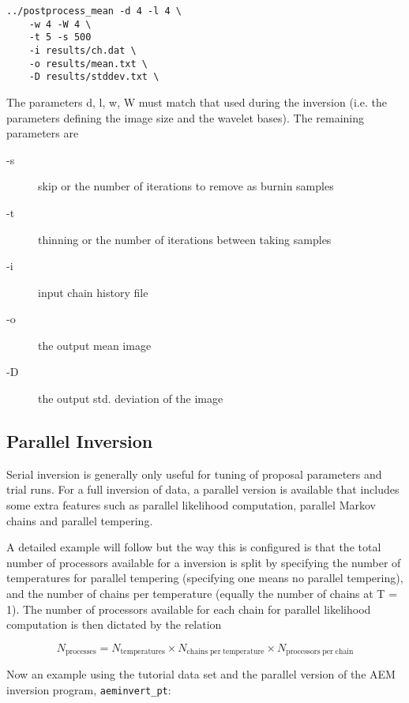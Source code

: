 \documentclass[a4paper,12pt]{article}
\begin{document}
\begin{verbatim}
../postprocess_mean -d 4 -l 4 \
	-w 4 -W 4 \
	-t 5 -s 500
	-i results/ch.dat \
	-o results/mean.txt \
	-D results/stddev.txt \
\end{verbatim}

The parameters d, l, w, W must match that used during the inversion (i.e. the parameters
defining the image size and the wavelet bases). The remaining parameters are

\begin{description}
\item[-s] skip or the number of iterations to remove as burnin samples
\item[-t] thinning or the number of iterations between taking samples
\item[-i] input chain history file
\item[-o] the output mean image
\item[-D] the output std. deviation of the image
\end{description}


\subsection{Parallel Inversion}

Serial inversion is generally only useful for tuning of proposal parameters and
trial runs. For a full inversion of data, a parallel version is available that
includes some extra features such as parallel likelihood computation, parallel Markov chains
and parallel tempering. 

A detailed example will follow but the way this is configured is that the total number
of processors available for a inversion is split by specifying the number of
temperatures for parallel tempering (specifying one means no parallel tempering), and the
number of chains per temperature (equally the number of chains at T = 1). The number of processors
available for each chain for parallel likelihood computation is then dictated by the relation

\begin{equation}
  N_{\mathrm{processes}} = N_{\mathrm{temperatures}} \times N_{\mathrm{chains\; per\; temperature}} \times N_{\mathrm{processors\; per\; chain}}
\end{equation}

Now an example using the tutorial data set and the parallel version of the AEM inversion
program, {\tt aeminvert\_pt}:
\end{document}
